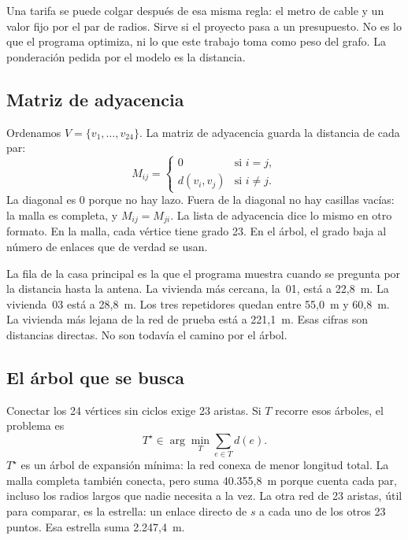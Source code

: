 \documentclass[12pt,a4paper]{article}
\begin{document}
Una tarifa se puede colgar después de esa misma regla: el metro de cable y un valor fijo por el par de radios. Sirve si el proyecto pasa a un presupuesto. No es lo que el programa optimiza, ni lo que este trabajo toma como peso del grafo. La ponderación pedida por el modelo es la distancia.

\subsection{Matriz de adyacencia}

Ordenamos \(V = \{v_1,\ldots,v_{24}\}\). La matriz de adyacencia guarda la distancia de cada par:
\begin{equation}
  M_{ij} =
  \begin{cases}
    0 & \text{si } i = j,\\
    d(v_i,v_j) & \text{si } i \neq j.
  \end{cases}
  \label{eq:matriz}
\end{equation}
La diagonal es 0 porque no hay lazo. Fuera de la diagonal no hay casillas vacías: la malla es completa, y \(M_{ij} = M_{ji}\). La lista de adyacencia dice lo mismo en otro formato. En la malla, cada vértice tiene grado 23. En el árbol, el grado baja al número de enlaces que de verdad se usan.

La fila de la casa principal es la que el programa muestra cuando se pregunta por la distancia hasta la antena. La vivienda más cercana, la~01, está a 22,8~m. La vivienda~03 está a 28,8~m. Los tres repetidores quedan entre 55,0~m y 60,8~m. La vivienda más lejana de la red de prueba está a 221,1~m. Esas cifras son distancias directas. No son todavía el camino por el árbol.

\subsection{El árbol que se busca}

Conectar los 24 vértices sin ciclos exige 23 aristas. Si \(T\) recorre esos árboles, el problema es
\begin{equation}
  T^{\star} \in \arg\min_{T} \sum_{e \in T} d(e).
  \label{eq:mst}
\end{equation}
\(T^{\star}\) es un árbol de expansión mínima: la red conexa de menor longitud total. La malla completa también conecta, pero suma 40.355,8~m porque cuenta cada par, incluso los radios largos que nadie necesita a la vez. La otra red de 23 aristas, útil para comparar, es la estrella: un enlace directo de \(s\) a cada uno de los otros 23 puntos. Esa estrella suma 2.247,4~m.
\end{document}
